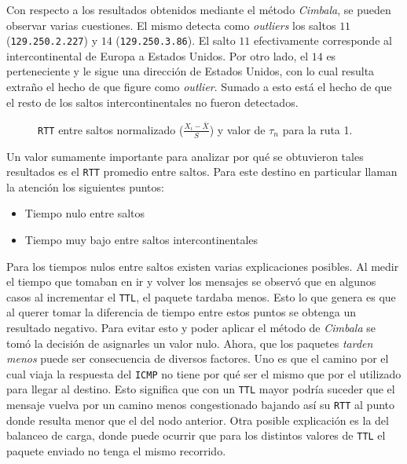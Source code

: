 Con respecto a los resultados obtenidos mediante el método \emph{Cimbala}, se
pueden observar varias cuestiones. El mismo detecta como \emph{outliers} los
saltos $11$ (\texttt{129.250.2.227}) y $14$ (\texttt{129.250.3.86}). El salto
$11$ efectivamente corresponde al intercontinental de Europa a Estados Unidos.
Por otro lado, el $14$ es perteneciente y le sigue una dirección de Estados Unidos,
con lo cual resulta extraño el hecho de que figure como \emph{outlier}. Sumado a
esto está el hecho de que el resto de los saltos intercontinentales no fueron
detectados.

\begin{figure}[H]
    \caption{\texttt{RTT} entre saltos normalizado ($\frac{X_i-\bar{X}}{S}$)
    y valor de $\tau_n$ para la ruta 1.}
    \label{res:esc1:rttnorm}
\end{figure}

Un valor sumamente importante para analizar por qué se obtuvieron tales
resultados es el \texttt{RTT} promedio entre saltos. Para este destino en
particular llaman la atención los siguientes puntos:

\begin{itemize}
    \item Tiempo nulo entre saltos
    \item Tiempo muy bajo entre saltos intercontinentales
\end{itemize}

Para los tiempos nulos entre saltos existen varias explicaciones posibles. Al
medir el tiempo que tomaban en ir y volver los mensajes se observó que en
algunos casos al incrementar el \texttt{TTL}, el paquete tardaba menos. Esto lo
que genera es que al querer tomar la diferencia de tiempo entre estos puntos se
obtenga un resultado negativo. Para evitar esto y poder aplicar el método de
\emph{Cimbala} se tomó la decisión de asignarles un valor nulo. Ahora, que los
paquetes \emph{tarden menos} puede ser consecuencia de diversos factores. Uno es
que el camino por el cual viaja la respuesta del \texttt{ICMP} no tiene por qué
ser el mismo que por el utilizado para llegar al destino.  Esto significa que con un
\texttt{TTL} mayor podría suceder que el mensaje vuelva por un camino menos
congestionado bajando así su \texttt{RTT} al punto donde resulta menor que el
del nodo anterior. Otra posible explicación es la del balanceo de carga, donde
puede ocurrir que para los distintos valores de \texttt{TTL} el paquete enviado
no tenga el mismo recorrido.

